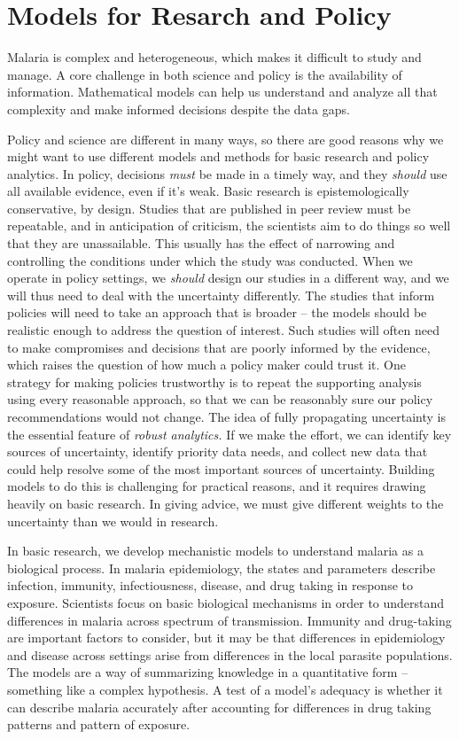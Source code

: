 \documentclass[
]{book}
\begin{document}
\hypertarget{models-for-resarch-and-policy}{%
\section{Models for Resarch and Policy}\label{models-for-resarch-and-policy}}

Malaria is complex and heterogeneous, which makes it difficult to study and manage. A core challenge in both science and policy is the availability of information. Mathematical models can help us understand and analyze all that complexity and make informed decisions despite the data gaps.

Policy and science are different in many ways, so there are good reasons why we might want to use different models and methods for basic research and policy analytics.
In policy, decisions \emph{must} be made in a timely way, and they \emph{should} use all available evidence, even if it's weak.
Basic research is epistemologically conservative, by design.
Studies that are published in peer review must be repeatable, and in anticipation of criticism, the scientists aim to do things so well that they are unassailable.
This usually has the effect of narrowing and controlling the conditions under which the study was conducted.
When we operate in policy settings, we \emph{should} design our studies in a different way, and we will thus need to deal with the uncertainty differently.
The studies that inform policies will need to take an approach that is broader -- the models should be realistic enough to address the question of interest.
Such studies will often need to make compromises and decisions that are poorly informed by the evidence, which raises the question of how much a policy maker could trust it.
One strategy for making policies trustworthy is to repeat the supporting analysis using every reasonable approach, so that we can be reasonably sure our policy recommendations would not change.
The idea of fully propagating uncertainty is the essential feature of \emph{robust analytics.}
If we make the effort, we can identify key sources of uncertainty, identify priority data needs, and collect new data that could help resolve some of the most important sources of uncertainty.
Building models to do this is challenging for practical reasons, and it requires drawing heavily on basic research.
In giving advice, we must give different weights to the uncertainty than we would in research.

In basic research, we develop mechanistic models to understand malaria as a biological process. In malaria epidemiology, the states and parameters describe infection, immunity, infectiousness, disease, and drug taking in response to exposure. Scientists focus on basic biological mechanisms in order to understand differences in malaria across spectrum of transmission. Immunity and drug-taking are important factors to consider, but it may be that differences in epidemiology and disease across settings arise from differences in the local parasite populations. The models are a way of summarizing knowledge in a quantitative form -- something like a complex hypothesis. A test of a model's adequacy is whether it can describe malaria accurately after accounting for differences in drug taking patterns and pattern of exposure.
\end{document}
